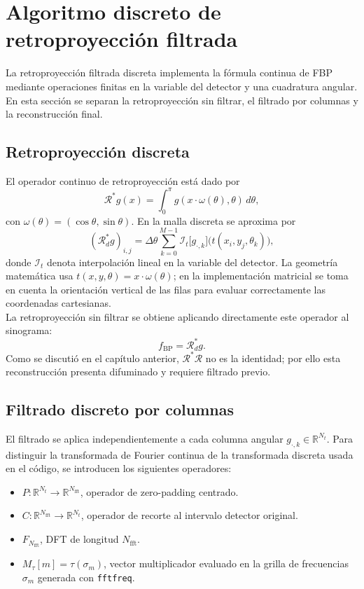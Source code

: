\section{Algoritmo discreto de retroproyección filtrada}

La retroproyección filtrada discreta implementa la fórmula continua de FBP mediante operaciones finitas en la variable del detector y una cuadratura angular. En esta sección se separan la retroproyección sin filtrar, el filtrado por columnas y la reconstrucción final.

\subsection*{Retroproyección discreta}

El operador continuo de retroproyección está dado por
\[
\mathcal R^*g(x)=\int_0^\pi g(x\cdot\omega(\theta),\theta)\,d\theta,
\]
con $\omega(\theta)=(\cos\theta,\sin\theta)$. En la malla discreta se aproxima por
\[
(\mathcal R_d^*g)_{i,j}
=
\Delta\theta\sum_{k=0}^{M-1}
\mathcal I_t\bigl[g_{\cdot,k}\bigr]
\bigl(t(x_i,y_j,\theta_k)\bigr),
\]
donde $\mathcal I_t$ denota interpolación lineal en la variable del detector. La geometría matemática usa $t(x,y,\theta)=x\cdot\omega(\theta)$; en la implementación matricial se toma en cuenta la orientación vertical de las filas para evaluar correctamente las coordenadas cartesianas.\\

La retroproyección sin filtrar se obtiene aplicando directamente este operador al sinograma:
\[
f_{\mathrm{BP}}=\mathcal R_d^*g.
\]
Como se discutió en el capítulo anterior, $\mathcal R^*\mathcal R$ no es la identidad; por ello esta reconstrucción presenta difuminado y requiere filtrado previo.

\subsection*{Filtrado discreto por columnas}

El filtrado se aplica independientemente a cada columna angular $g_{\cdot,k}\in\mathbb R^{N_t}$. Para distinguir la transformada de Fourier continua de la transformada discreta usada en el código, se introducen los siguientes operadores:
\begin{itemize}
    \item $P:\mathbb R^{N_t}\to\mathbb R^{N_{\mathrm{fft}}}$, operador de zero-padding centrado.
    \item $C:\mathbb R^{N_{\mathrm{fft}}}\to\mathbb R^{N_t}$, operador de recorte al intervalo detector original.
    \item $F_{N_{\mathrm{fft}}}$, DFT de longitud $N_{\mathrm{fft}}$.
    \item $M_\tau[m]=\tau(\sigma_m)$, vector multiplicador evaluado en la grilla de frecuencias $\sigma_m$ generada con \texttt{fftfreq}.
\end{itemize}

